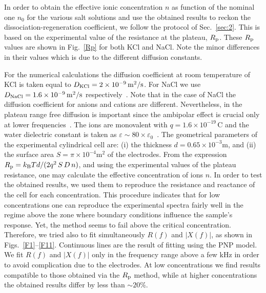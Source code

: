 \documentclass[preprint,aps,pre]{revtex4}
\begin{document}
In order to obtain the effective ionic concentration $n$ as function of the nominal one $n_0$ for the various salt solutions and use the obtained results to reckon the dissociation-regeneration coefficient, we follow the protocol of Sec.~\ref{sec:2}. This is based on the experimental value of the resistance at the plateau, $R_{\rm p}$.  These $R_{\rm p}$ values are shown in Fig.~\ref{Rp} for both KCl and NaCl. Note the minor differences in their values which is due to the different diffusion constants.

For the numerical calculations the diffusion coefficient at room temperature of KCl is taken equal to $D_{\rm KCl}=2\times 10^{-9}\,\mathrm{m^2/s}$. For NaCl we use $D_{\rm NaCl}=1.6\times 10^{-9}\,\mathrm{m^2/s}$ respectively~\cite{D,D2,diffusion}. Note that in the case of NaCl the diffusion coefficient for anions and cations are different. Nevertheless, in the plateau range free diffusion is important since the ambipolar effect is crucial only at lower frequencies~\cite{ambi}. The ions are monovalent with $q=1.6\times 10^{-19}\,\mathrm{C}$ and the water dielectric constant is taken as $\varepsilon\sim 80\times \varepsilon_0$~\cite{atkins}. The geometrical parameters of the experimental cylindrical cell are: (i) the thickness $d=0.65\times10^{-3}$m, and (ii) the surface area  $S=\pi\times 10^{-4}$m$^2$ of the electrodes. From the expression $R_{\rm p}=k_{\rm B}Td/(2q^2\,S\,D\,n)$, and using the experimental values of the plateau resistance, one may calculate the effective concentration of ions $n$. In order to test the obtained results, we used them to reproduce the resistance and reactance of the cell for each concentration. This procedure indicates that for low concentrations one can reproduce the experimental spectra fairly well in the regime above the zone where boundary conditions influence the sample's response. Yet, the method seems to fail above the critical concentration. Therefore, we tried also to fit simultaneously $R(f)$ and $\left|X(f)\right|$, as shown in Figs.~\ref{F1}--\ref{F11}. Continuous lines are the result of fitting using the PNP model. We fit $R(f)$ and $\left|X(f)\right|$ only in the frequency range above a few kHz in order to avoid complication due to the electrodes. At low concentrations we find results compatible to those obtained via the $R_{\rm p}$ method, while at higher concentrations the obtained results differ by less than $\sim 20\%$.
\end{document}
